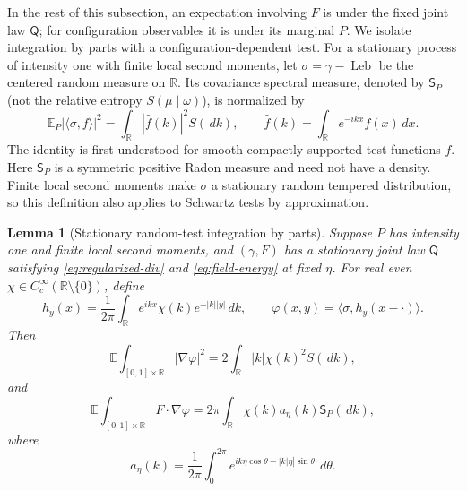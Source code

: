 \documentclass[11pt,reqno]{amsart}
\numberwithin{equation}{section}
\newtheorem{lemma}[theorem]{Lemma}
\theoremstyle{definition}
\theoremstyle{remark}
\newcommand{\R}{\mathbb R}
\newcommand{\E}{\mathbb E}
\newcommand{\1}{\mathbf 1}
\newcommand{\Spec}{\mathsf S_P}
\newcommand{\Leb}{\operatorname{Leb}}
\newcommand{\dd}{\,d}
\begin{document}
In the rest of this subsection, an expectation involving $F$ is under
the fixed joint law $\mathsf Q$; for configuration observables it is
under its marginal $P$. We isolate integration by parts with a
configuration-dependent test. For a stationary process of intensity one
with finite local second moments, let $\sigma=\gamma-\Leb$ be the
centered random measure on $\R$. Its covariance spectral measure,
denoted by $\Spec$ (not the relative entropy $S(\mu\mid\omega)$), is
normalized by
\begin{equation}\label{eq:covariance-spectrum}
\E_P|\langle\sigma,f\rangle|^2
=\int_\R|\widehat f(k)|^2S(\dd k),\qquad
\widehat f(k)=\int_\R e^{-ikx}f(x)\dd x.
\end{equation}
The identity is first understood for smooth compactly supported test
functions $f$. Here $\Spec$ is a symmetric positive Radon measure and
need not have a density. Finite local second moments make $\sigma$ a stationary random
tempered distribution, so this definition also applies to Schwartz
tests by approximation.

\begin{samepage}
\begin{lemma}[Stationary random-test integration by parts]
\label{lem:stationary-ibp}
Suppose $P$ has intensity one and finite local second moments, and
$(\gamma,F)$ has a stationary joint law $\mathsf Q$ satisfying
\eqref{eq:regularized-div} and \eqref{eq:field-energy} at fixed $\eta$.
For real even $\chi\in C_c^\infty(\R\setminus\{0\})$, define
\[
h_y(x)=\frac1{2\pi}\int_\R
e^{ikx}\chi(k)e^{-|k||y|}\dd k,
\qquad \varphi(x,y)=\langle\sigma,h_y(x-\cdot)\rangle.
\]
Then
\begin{equation}\label{eq:test-energy}
\E\int_{[0,1]\times\R}|\nabla\varphi|^2
=2\int_\R |k|\chi(k)^2S(\dd k),
\end{equation}
and
\begin{equation}\label{eq:test-pairing}
\E\int_{[0,1]\times\R}F\cdot\nabla\varphi
=2\pi\int_\R\chi(k)a_\eta(k)\Spec(\dd k),
\end{equation}
where
\[
a_\eta(k)=\frac1{2\pi}\int_0^{2\pi}
e^{ik\eta\cos\theta-|k|\eta|\sin\theta|}\dd\theta.
\]
\end{lemma}
\end{samepage}
\end{document}
